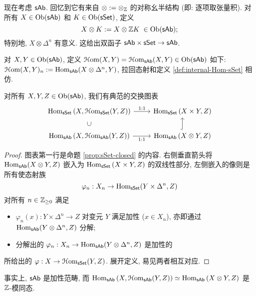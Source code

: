 现在考虑 $\mathsf{sAb}$. 回忆到它有来自 $\otimes := \otimes_{\mathbb{Z}}$ 的对称幺半结构 (即: 逐项取张量积). 对所有 $X \in \operatorname{Ob}(\mathsf{sAb})$ 和 $K \in \operatorname{Ob}(\mathsf{sSet})$, 定义
\[ X \otimes K := X \otimes \mathbb{Z} K \; \in \operatorname{Ob}(\mathsf{sAb}); \]
特别地, $X \otimes \Delta^n$ 有意义. 这给出双函子 $\mathsf{sAb} \times \mathsf{sSet} \to \mathsf{sAb}$.

\begin{definition}
	对 $X, Y \in \operatorname{Ob}(\mathsf{sAb})$, 定义 $\EuScript{H}\mathrm{om}(X, Y) = \EuScript{H}\mathrm{om}_{\mathsf{sAb}}(X, Y) \in \operatorname{Ob}(\mathsf{sAb})$ 如下: $\EuScript{H}\mathrm{om}(X, Y)_n := \operatorname{Hom}_{\mathsf{sAb}}(X \otimes \Delta^n, Y)$, 拉回态射和定义 \ref{def:internal-Hom-sSet} 相仿.
\end{definition}

\begin{proposition}\label{prop:sAb-closed}
	对所有 $X, Y, Z \in \operatorname{Ob}(\mathsf{sAb})$, 我们有典范的交换图表
	\[\begin{tikzcd}
		\Hom_{\cate{sSet}}\left(X, \iHom_{\cate{sSet}}(Y, Z) \right) \arrow[r, "1:1"] & \Hom_{\cate{sSet}}\left( X \times Y, Z \right) \\
		\Hom_{\cate{sAb}}\left(X, \iHom_{\cate{sAb}}(Y, Z) \right) \arrow[r, "1:1"'] \arrow[phantom, u, "\subset" description, sloped] & \Hom_{\cate{sAb}}\left( X \otimes Y, Z \right) \arrow[hookrightarrow, u]
	\end{tikzcd}\]
\end{proposition}
\begin{proof}
	图表第一行是命题 \ref{prop:sSet-closed} 的内容. 右侧垂直箭头将 $\operatorname{Hom}_{\mathsf{sAb}}(X \otimes Y, Z)$ 嵌入为 $\operatorname{Hom}_{\mathsf{sSet}}\left( X \times Y, Z \right)$ 的双线性部分, 左侧嵌入的像则是所有使态射族
	\[ \varphi_n: X_n \to \operatorname{Hom}_{\mathsf{sSet}}(Y \times \Delta^n, Z) \]
	对所有 $n \in \mathbb{Z}_{\geq 0}$ 满足
	\begin{itemize}
		\item $\varphi_n(x): Y \times \Delta^n \to Z$ 对变元 $Y$ 满足加性 ($x \in X_n$), 亦即通过 $\operatorname{Hom}_{\mathsf{sAb}}(Y \otimes \Delta^n, Z)$ 分解;
		\item 分解出的 $\varphi_n: X_n \to \operatorname{Hom}_{\mathsf{sAb}}(Y \otimes \Delta^n, Z)$ 是加性的
	\end{itemize}
	所给出的 $\varphi: X \to \EuScript{H}\mathrm{om}_{\mathsf{sSet}}(Y, Z)$.
	展开定义, 易见两者相互对应.
\end{proof}

事实上, $\mathsf{sAb}$ 是加性范畴, 而 $\operatorname{Hom}_{\mathsf{sAb}}\left(X, \EuScript{H}\mathrm{om}_{\mathsf{sAb}}(Y, Z) \right) \simeq \operatorname{Hom}_{\mathsf{sAb}}\left( X \otimes Y, Z \right)$ 是 $\mathbb{Z}$-模同态.

